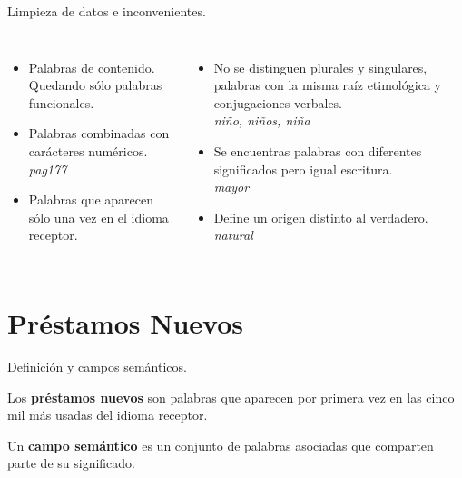 \documentclass[10pt,xcolor={usenames,dvipsnames}]{beamer}
\begin{document}
\begin{frame}[fragile]{Limpieza de datos e inconvenientes.}
	\begin{columns}
		\begin{itemize}
			\item<1->[$\blacksquare$] Palabras de contenido. Quedando sólo palabras funcionales.
			\item<2->[$\blacksquare$] Palabras combinadas con carácteres numéricos.
			\\
			\centering\textcolor{Sepia}{\textit{pag177}}
			\item<3->[$\blacksquare$] Palabras que aparecen sólo una vez en el idioma receptor.
			
		\end{itemize}
		
		\begin{itemize}
			\item<4-6>[$\blacksquare$] No se distinguen plurales y singulares, palabras con la misma raíz etimológica y conjugaciones verbales.
			\\
			\centering\textcolor{Sepia}{\textit{niño, niños, niña}}
			\item<5-6>[$\blacksquare$]Se encuentras palabras con diferentes significados pero igual escritura.
			\\
			\centering\textcolor{Sepia}{\textit{mayor}}
			\item<6>[$\blacksquare$]Define un origen distinto al verdadero.
			\\
			\centering\textcolor{Sepia}{\textit{natural}}
			
		\end{itemize}
		
	\end{columns}
\end{frame}

\section{Préstamos Nuevos}


\begin{frame}[fragile]{Definición y campos semánticos.}
	
	Los \textbf{préstamos nuevos} son palabras que aparecen por primera vez en las cinco mil más usadas del idioma receptor.
	
	Un \textbf{campo semántico} es un conjunto de palabras asociadas que comparten parte de su significado. 
\end{frame}
\end{document}
